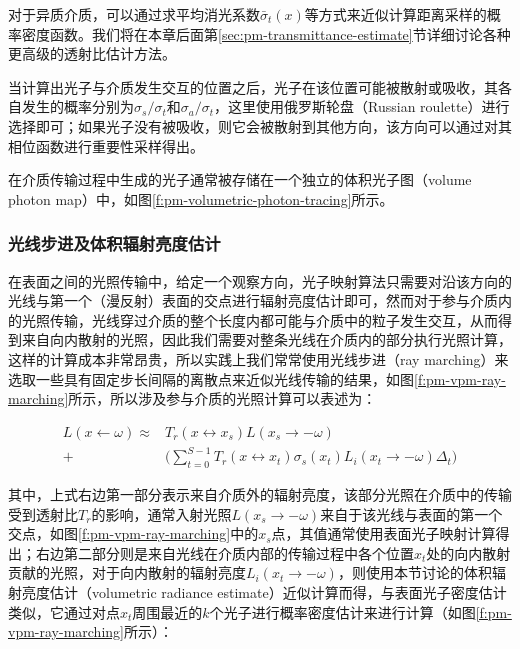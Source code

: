 对于异质介质，可以通过求平均消光系数$\bar{\sigma}_t(x)$等方式来近似计算距离采样的概率密度函数。我们将在本章后面第\ref{sec:pm-transmittance-estimate}节详细讨论各种更高级的透射比估计方法。

当计算出光子与介质发生交互的位置之后，光子在该位置可能被散射或吸收，其各自发生的概率分别为$\sigma_s/\sigma_t$和$\sigma_a/\sigma_t$，这里使用俄罗斯轮盘（Russian roulette）进行选择即可；如果光子没有被吸收，则它会被散射到其他方向，该方向可以通过对其相位函数进行重要性采样得出。

在介质传输过程中生成的光子通常被存储在一个独立的体积光子图（volume photon map）中，如图\ref{f:pm-volumetric-photon-tracing}所示。






\subsubsection{光线步进及体积辐射亮度估计}
在表面之间的光照传输中，给定一个观察方向，光子映射算法只需要对沿该方向的光线与第一个（漫反射）表面的交点进行辐射亮度估计即可，然而对于参与介质内的光照传输，光线穿过介质的整个长度内都可能与介质中的粒子发生交互，从而得到来自向内散射的光照，因此我们需要对整条光线在介质内的部分执行光照计算，这样的计算成本非常昂贵，所以实践上我们常常使用光线步进（ray marching）来选取一些具有固定步长间隔的离散点来近似光线传输的结果，如图\ref{f:pm-vpm-ray-marching}所示，所以涉及参与介质的光照计算可以表述为：

\begin{equation}
\begin{aligned}
	L(x\leftarrow{\omega})\approx &T_r(x\leftrightarrow x_s)L(x_s\to -{\omega})\\ +&\Biggl(\sum^{S-1}_{t=0}T_r(x\leftrightarrow x_t)\sigma_s(x_t)L_i(x_t\to -{\omega})\Delta_t\Biggl)
\end{aligned}
\end{equation}

其中，上式右边第一部分表示来自介质外的辐射亮度，该部分光照在介质中的传输受到透射比$T_r$的影响，通常入射光照$L(x_s\to -{\omega})$来自于该光线与表面的第一个交点，如图\ref{f:pm-vpm-ray-marching}中的$x_s$点，其值通常使用表面光子映射计算得出；右边第二部分则是来自光线在介质内部的传输过程中各个位置$x_t$处的向内散射贡献的光照，对于向内散射的辐射亮度$L_i(x_t\to -{\omega})$，则使用本节讨论的体积辐射亮度估计（volumetric radiance estimate）近似计算而得，与表面光子密度估计类似，它通过对点$x_t$周围最近的$k$个光子进行概率密度估计来进行计算（如图\ref{f:pm-vpm-ray-marching}所示）：

